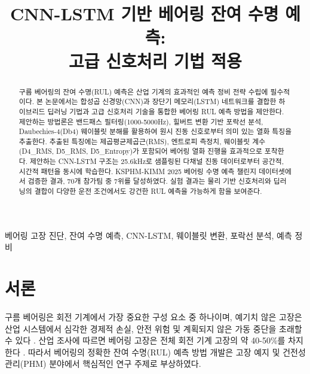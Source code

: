 \documentclass[conference,twocolumn]{IEEEtran}
\begin{document}
\title{CNN-LSTM 기반 베어링 잔여 수명 예측:\\고급 신호처리 기법 적용}

\author{
\and
{}
}

\maketitle

\begin{abstract}
구름 베어링의 잔여 수명(RUL) 예측은 산업 기계의 효과적인 예측 정비 전략 수립에 필수적이다. 본 논문에서는 합성곱 신경망(CNN)과 장단기 메모리(LSTM) 네트워크를 결합한 하이브리드 딥러닝 기법과 고급 신호처리 기술을 통합한 베어링 RUL 예측 방법을 제안한다. 제안하는 방법론은 밴드패스 필터링(1000-5000Hz), 힐버트 변환 기반 포락선 분석, Daubechies-4(Db4) 웨이블릿 분해를 활용하여 원시 진동 신호로부터 의미 있는 열화 특징을 추출한다. 추출된 특징에는 제곱평균제곱근(RMS), 엔트로피 측정치, 웨이블릿 계수(D4\_RMS, D5\_RMS, D5\_Entropy)가 포함되어 베어링 열화 진행을 효과적으로 포착한다. 제안하는 CNN-LSTM 구조는 25.6kHz로 샘플링된 다채널 진동 데이터로부터 공간적, 시간적 패턴을 동시에 학습한다. KSPHM-KIMM 2025 베어링 수명 예측 챌린지 데이터셋에서 검증한 결과, 70개 참가팀 중 7위를 달성하였다. 실험 결과는 물리 기반 신호처리와 딥러닝의 결합이 다양한 운전 조건에서도 강건한 RUL 예측을 가능하게 함을 보여준다.
\end{abstract}

\begin{IEEEkeywords}
베어링 고장 진단, 잔여 수명 예측, CNN-LSTM, 웨이블릿 변환, 포락선 분석, 예측 정비
\end{IEEEkeywords}

\section{서론}

구름 베어링은 회전 기계에서 가장 중요한 구성 요소 중 하나이며, 예기치 않은 고장은 산업 시스템에서 심각한 경제적 손실, 안전 위험 및 계획되지 않은 가동 중단을 초래할 수 있다 \cite{lei2018machinery}. 산업 조사에 따르면 베어링 고장은 전체 회전 기계 고장의 약 40-50\%를 차지한다 \cite{randall2011rolling}. 따라서 베어링의 정확한 잔여 수명(RUL) 예측 방법 개발은 고장 예지 및 건전성 관리(PHM) 분야에서 핵심적인 연구 주제로 부상하였다.
\end{document}
